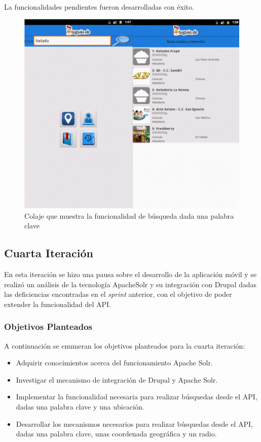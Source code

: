 La funcionalidades pendientes fueron desarrolladas con éxito. 

\begin{figure}[h]
	\begin{center}
		\includegraphics[scale=0.5]{imagenes/search_keyword.png}
	\end{center}
	\caption{
		\label{img:keyword}
		Colaje que muestra la funcionalidad de búsqueda dada una palabra clave
	}
\end{figure}

\subsection{Cuarta Iteración}

En esta iteración se hizo una pausa sobre el desarrollo de la aplicación móvil y se realizó un análisis de la tecnología ApacheSolr y su integración con Drupal dadas las deficiencias encontradas en el \textit{sprint} anterior, con el objetivo de poder extender la funcionalidad del API. 

\subsubsection{Objetivos Planteados} 
A continuación se enumeran los objetivos planteados para la cuarta iteración:
\begin{itemize}

\item Adquirir conocimientos acerca del funcionamiento Apache Solr.
\item Investigar el mecanismo de integración de Drupal y Apache Solr.
\item Implementar la funcionalidad necesaria para realizar búsquedas desde el API, dadas una palabra clave y una ubicación.
\item Desarrollar los mecanismos necesarios para realizar búsquedas desde el API, dadas una palabra clave, unas coordenada geográfica y un radio.

\end{itemize}

